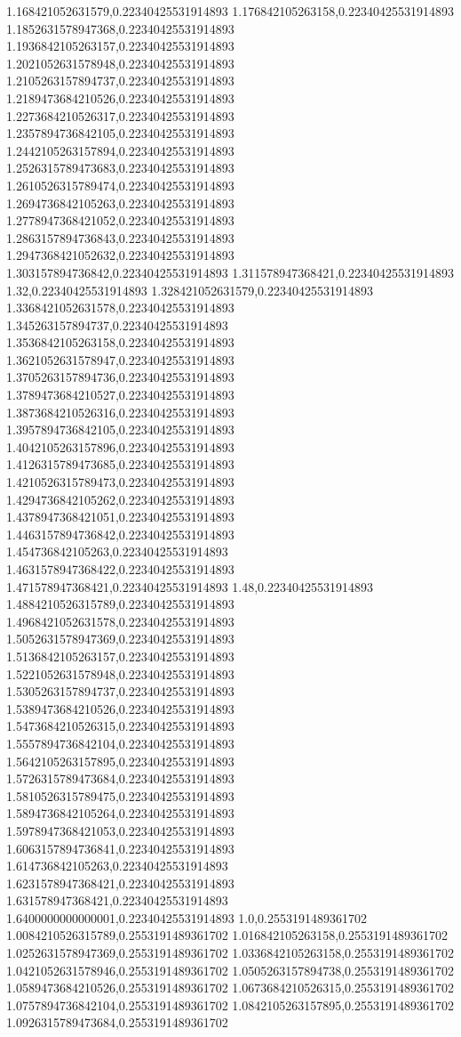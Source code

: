 1.168421052631579,0.22340425531914893
1.176842105263158,0.22340425531914893
1.1852631578947368,0.22340425531914893
1.1936842105263157,0.22340425531914893
1.2021052631578948,0.22340425531914893
1.2105263157894737,0.22340425531914893
1.2189473684210526,0.22340425531914893
1.2273684210526317,0.22340425531914893
1.2357894736842105,0.22340425531914893
1.2442105263157894,0.22340425531914893
1.2526315789473683,0.22340425531914893
1.2610526315789474,0.22340425531914893
1.2694736842105263,0.22340425531914893
1.2778947368421052,0.22340425531914893
1.2863157894736843,0.22340425531914893
1.2947368421052632,0.22340425531914893
1.303157894736842,0.22340425531914893
1.311578947368421,0.22340425531914893
1.32,0.22340425531914893
1.328421052631579,0.22340425531914893
1.3368421052631578,0.22340425531914893
1.345263157894737,0.22340425531914893
1.3536842105263158,0.22340425531914893
1.3621052631578947,0.22340425531914893
1.3705263157894736,0.22340425531914893
1.3789473684210527,0.22340425531914893
1.3873684210526316,0.22340425531914893
1.3957894736842105,0.22340425531914893
1.4042105263157896,0.22340425531914893
1.4126315789473685,0.22340425531914893
1.4210526315789473,0.22340425531914893
1.4294736842105262,0.22340425531914893
1.4378947368421051,0.22340425531914893
1.4463157894736842,0.22340425531914893
1.454736842105263,0.22340425531914893
1.4631578947368422,0.22340425531914893
1.471578947368421,0.22340425531914893
1.48,0.22340425531914893
1.4884210526315789,0.22340425531914893
1.4968421052631578,0.22340425531914893
1.5052631578947369,0.22340425531914893
1.5136842105263157,0.22340425531914893
1.5221052631578948,0.22340425531914893
1.5305263157894737,0.22340425531914893
1.5389473684210526,0.22340425531914893
1.5473684210526315,0.22340425531914893
1.5557894736842104,0.22340425531914893
1.5642105263157895,0.22340425531914893
1.5726315789473684,0.22340425531914893
1.5810526315789475,0.22340425531914893
1.5894736842105264,0.22340425531914893
1.5978947368421053,0.22340425531914893
1.6063157894736841,0.22340425531914893
1.614736842105263,0.22340425531914893
1.6231578947368421,0.22340425531914893
1.631578947368421,0.22340425531914893
1.6400000000000001,0.22340425531914893
1.0,0.2553191489361702
1.0084210526315789,0.2553191489361702
1.016842105263158,0.2553191489361702
1.0252631578947369,0.2553191489361702
1.0336842105263158,0.2553191489361702
1.0421052631578946,0.2553191489361702
1.0505263157894738,0.2553191489361702
1.0589473684210526,0.2553191489361702
1.0673684210526315,0.2553191489361702
1.0757894736842104,0.2553191489361702
1.0842105263157895,0.2553191489361702
1.0926315789473684,0.2553191489361702
